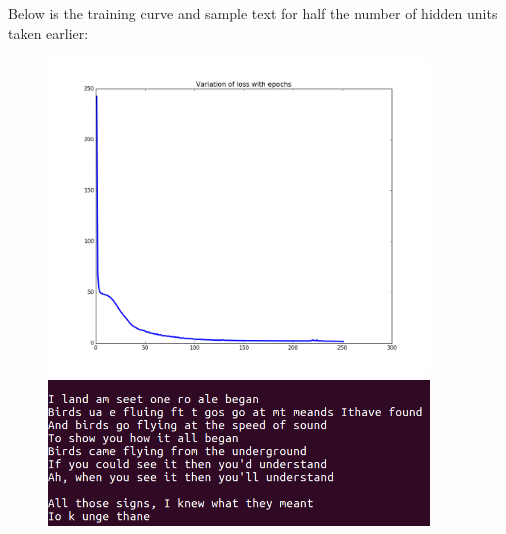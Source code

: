 \documentclass{article}
\begin{document}
\begin{flushleft}
\begin{itemize}
Below is the training curve and sample text for half the number of hidden units taken earlier:
\begin{figure}[H]
\begin{minipage}{0.475\linewidth}
\centering
\includegraphics[width=0.9\textwidth]{RNN_training_HU0_5x.png}
\end{minipage}
\hfill
\begin{minipage}{0.475\linewidth}
\centering
\includegraphics[width=0.9\textwidth]{RNN_text_HU0_5x.png}
\end{minipage}
\end{figure}


\end{itemize}
\end{flushleft}
\end{document}
